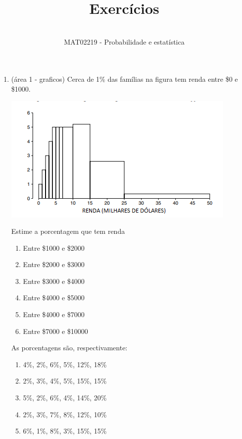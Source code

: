 \documentclass[12pt]{article}\documentclass[brazilian,12pt,a4paper,final]{article}
\begin{document}
 
 
\title{Exercícios}%
\author{\\ %
MAT02219 - Probabilidade e estatística} %
 
\maketitle
 \begin{enumerate} 

\section{CAPÍTULO 3}

 \item (área 1 - graficos) Cerca de 1\% das famílias na figura tem renda entre \$0 e \$1000.
 
 \includegraphics{Figuras/3A1.png}
 
 Estime a porcentagem que tem renda
 \begin{enumerate}[label=\Roman*]
     \item Entre \$1000 e \$2000
     \item Entre \$2000 e \$3000
     \item Entre \$3000 e \$4000
     \item Entre \$4000 e \$5000
     \item Entre \$4000 e \$7000
     \item Entre \$7000 e \$10000
\end{enumerate}
As porcentagens são, respectivamente:
\begin{enumerate}[label=(\alph*)]
\item 4\%, 2\%, 6\%, 5\%, 12\%, 18\%
\item 2\%, 3\%, 4\%, 5\%, 15\%, 15\%
\item 5\%, 2\%, 6\%, 4\%, 14\%, 20\%
\item 2\%, 3\%, 7\%, 8\%, 12\%, 10\%
\item 6\%, 1\%, 8\%, 3\%, 15\%, 15\%


\end{enumerate}
\end{enumerate}
\end{document}
